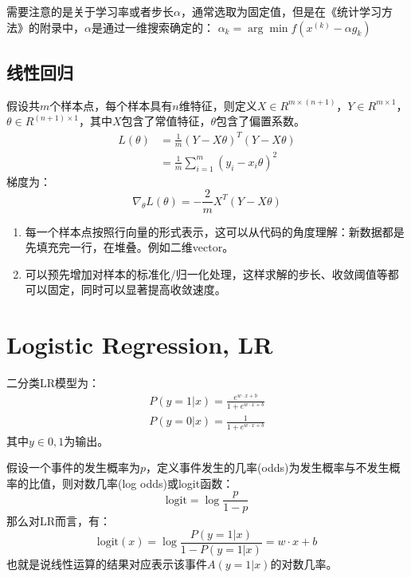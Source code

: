 需要注意的是关于学习率或者步长$\alpha$，通常选取为固定值，但是在《统计学习方法》的附录中，$\alpha$是通过一维搜索确定的：
$\alpha_k = \arg \min f(x^{(k)} - \alpha g_k)$

\subsection{线性回归}
假设共$m$个样本点，每个样本具有$n$维特征，则定义$X \in R^{m \times (n+1)}$，$Y \in R^{m\times 1}$，
$\theta \in R^{(n+1)\times 1}$，其中$X$包含了常值特征，$\theta$包含了偏置系数。
\begin{align*}
    L(\theta) &= \frac{1}{m} (Y-X\theta)^T (Y-X\theta) \\
    &= \frac{1}{m} \sum_{i=1}^m (y_i - x_i \theta)^2
\end{align*}
梯度为：
\begin{equation*}
    \nabla_\theta L(\theta) = -\frac{2}{m} X^T (Y-X\theta)
\end{equation*}

{}
\begin{enumerate}
\item 每一个样本点按照行向量的形式表示，这可以从代码的角度理解：新数据都是先填充完一行，在堆叠。例如二维vector。
\item 可以预先增加对样本的标准化/归一化处理，这样求解的步长、收敛阈值等都可以固定，同时可以显著提高收敛速度。
\end{enumerate}


\section{Logistic Regression, LR}
二分类LR模型为：
\begin{gather*}
    P(y=1|x) = \frac{e^{w\cdot x + b}}{1 + e^{w\cdot x + b}}\\
    P(y=0|x) = \frac{1}{1 + e^{w\cdot x + b}}
\end{gather*}
其中$y\in{0,1}$为输出。

假设一个事件的发生概率为$p$，定义事件发生的几率(odds)为发生概率与不发生概率的比值，则对数几率(log odds)或logit函数：
\begin{equation*}
    \text{logit} = \log \frac{p}{1-p}
\end{equation*}
那么对LR而言，有：
\begin{equation*}
    \text{logit}(x) = \log\frac{P(y=1|x)}{1-P({y=1|x})} = w\cdot x + b
\end{equation*}
也就是说线性运算的结果对应表示该事件$A(y=1|x)$的对数几率。

